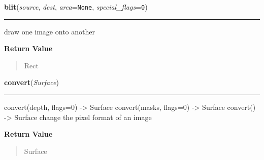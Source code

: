     \label{pygame:Surface:blit}

    \vspace{0.5ex}

\hspace{.8\funcindent}\begin{boxedminipage}{\funcwidth}

    \raggedright \textbf{blit}(\textit{source}, \textit{dest}, \textit{area}={\tt None}, \textit{special\_flags}={\tt  0})

    \vspace{-1.5ex}

    \rule{\textwidth}{0.5\fboxrule}
\setlength{\parskip}{2ex}
    draw one image onto another

\setlength{\parskip}{1ex}
      \textbf{Return Value}
    \vspace{-1ex}

      \begin{quote}
      Rect

      \end{quote}

    \end{boxedminipage}

    \label{pygame:Surface:convert}

    \vspace{0.5ex}

\hspace{.8\funcindent}\begin{boxedminipage}{\funcwidth}

    \raggedright \textbf{convert}(\textit{Surface})

    \vspace{-1.5ex}

    \rule{\textwidth}{0.5\fboxrule}
\setlength{\parskip}{2ex}
    convert(depth, flags=0) -{\textgreater} Surface convert(masks, flags=0)
    -{\textgreater} Surface convert() -{\textgreater} Surface change the 
    pixel format of an image

\setlength{\parskip}{1ex}
      \textbf{Return Value}
    \vspace{-1ex}

      \begin{quote}
      Surface

      \end{quote}

    \end{boxedminipage}

